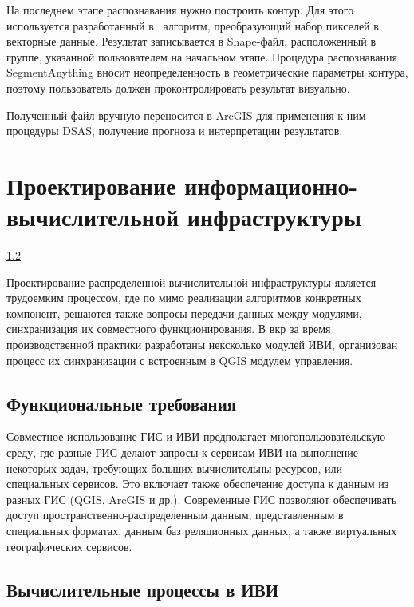 \documentclass[732,fontsize=14pt,final]{studrep}
\begin{document}
На последнем этапе распознавания нужно построить контур. Для этого используется разработанный в~\cite{b3} алгоритм, преобразующий набор пикселей в векторные данные. Результат записывается в Shape-файл, расположенный в группе, указанной пользователем на начальном этапе. Процедура распознавания SegmentAnything вносит неопределенность в геометрические параметры контура, поэтому пользователь должен проконтролировать результат визуально.

Полученный файл вручную переносится в ArcGIS для применения к ним процедуры DSAS, получение прогноза и интерпретации результатов.

\section{Проектирование информационно-вычислительной инфраструктуры}\ref{sec:ivi}

Проектирование распределенной вычислительной инфраструктуры является трудоемким процессом, где по мимо реализации алгоритмов конкретных компонент, решаются также вопросы передачи данных между модулями, синхранизация их совместного функционирования. В вкр за время производственной практики разработаны нексколько модулей ИВИ, организован процесс их синхранизации с встроенным в QGIS модулем управления.

\subsection{Функциональные требования}

Совместное использование ГИС и ИВИ предполагает многопользовательскую среду, где разные ГИС делают запросы к сервисам ИВИ на выполнение некоторых задач, требующих больших вычислительны ресурсов, или специальных сервисов. Это включает также обеспечение доступа к данным из разных ГИС (QGIS, ArcGIS и др.). Современные ГИС позволяют обеспечивать доступ пространственно-распределенным данным, представленным в специальных форматах, данным баз реляционных данных, а также виртуальных географических сервисов.

\subsection{Вычислительные процессы в ИВИ}\label{sec:ivi}
\end{document}
